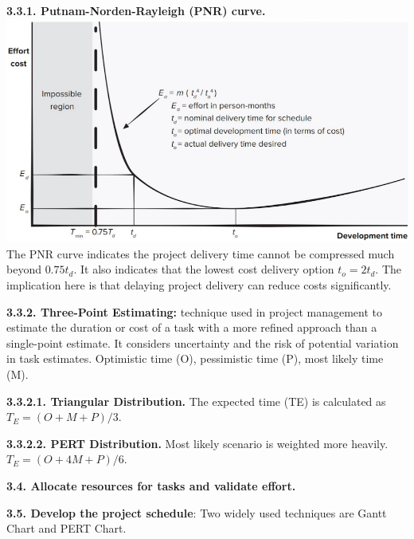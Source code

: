         \textbf{3.3.1. Putnam-Norden-Rayleigh (PNR) curve.}
        \includegraphics[width=\linewidth]{figs/SCR-20240606-ozjp.png}
        The PNR curve indicates the project delivery time cannot be compressed much beyond $0.75t_d$. It also indicates that the lowest cost delivery option $t_o = 2t_d$. The implication here is that delaying project delivery can reduce costs significantly.

        \textbf{3.3.2. Three-Point Estimating:} technique used in project management to estimate the duration or cost of a task with a more refined approach than a single-point estimate. It considers uncertainty and the risk of potential variation in task estimates. Optimistic time (O), pessimistic time (P), most likely time (M).

            \textbf{3.3.2.1. Triangular Distribution.}
            The expected time (TE) is calculated as $T_E = (O + M + P) / 3$.

            \textbf{3.3.2.2. PERT Distribution.}
            Most likely scenario is weighted more heavily. $T_E = (O + 4M + P) / 6$.

    \textbf{3.4. Allocate resources for tasks and validate effort.}


    \textbf{3.5. Develop the project schedule}: Two widely used techniques are Gantt Chart and PERT Chart.

